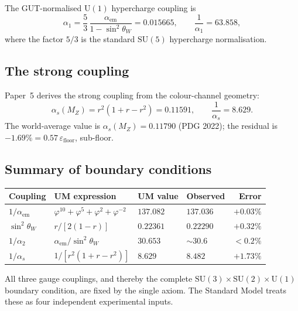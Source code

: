 \documentclass[12pt]{article}
\begin{document}
The GUT-normalised $\mathrm{U}(1)$ hypercharge coupling is
\begin{equation}
  \alpha_1
  = \frac{5}{3}\,\frac{\alpha_{\text{em}}}{1 - \sin^2\!\theta_W}
  = 0.015665,
  \qquad
  \frac{1}{\alpha_1} = 63.858,
  \label{eq:alpha1}
\end{equation}
where the factor $5/3$ is the standard $\mathrm{SU}(5)$ hypercharge
normalisation.

\subsection{The strong coupling}

Paper~5 derives the strong coupling from the colour-channel geometry:
\begin{equation}
  \alpha_s(M_Z)
  = r^2(1 + r - r^2)
  = 0.11591,
  \qquad
  \frac{1}{\alpha_s} = 8.629.
  \label{eq:alpha3}
\end{equation}
The world-average value is $\alpha_s(M_Z) = 0.11790$ (PDG 2022); the
residual is $-1.69\% = 0.57\,\varepsilon_{\text{floor}}$, sub-floor.

\subsection{Summary of boundary conditions}

{\color{gold}
\begin{center}
\begin{tabular}{llllr}
\toprule
Coupling & UM expression & UM value & Observed & Error \\
\midrule
$1/\alpha_{\text{em}}$
  & $\varphi^{10}+\varphi^5+\varphi^2+\varphi^{-2}$
  & $137.082$ & $137.036$ & $+0.03\%$ \\
$\sin^2\!\theta_W$
  & $r/[2(1-r)]$
  & $0.22361$ & $0.22290$ & $+0.32\%$ \\
$1/\alpha_2$
  & $\alpha_{\text{em}}/\sin^2\!\theta_W$
  & $30.653$  & ${\sim}30.6$ & $<0.2\%$ \\
$1/\alpha_s$
  & $1/[r^2(1+r-r^2)]$
  & $8.629$   & $8.482$   & $+1.73\%$ \\
\bottomrule
\end{tabular}
\end{center}
}

All three gauge couplings, and thereby the complete $\mathrm{SU}(3)\times
\mathrm{SU}(2)\times \mathrm{U}(1)$ boundary condition, are fixed by the
single axiom. The Standard Model treats these as four independent experimental
inputs.
\end{document}
